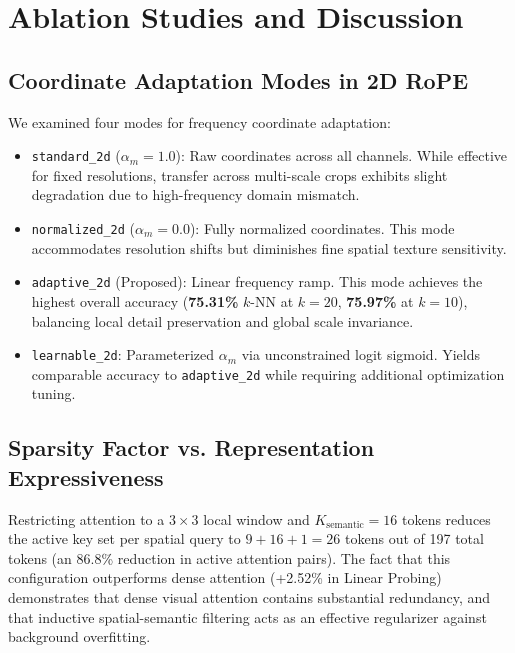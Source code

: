 \documentclass[11pt,a4paper]{article}
\begin{document}
\section{Ablation Studies and Discussion}
\label{sec:ablations}

\subsection{Coordinate Adaptation Modes in 2D RoPE}
We examined four modes for frequency coordinate adaptation:
\begin{itemize}[leftmargin=*]
    \item \texttt{standard\_2d} ($\alpha_m = 1.0$): Raw coordinates across all channels. While effective for fixed resolutions, transfer across multi-scale crops exhibits slight degradation due to high-frequency domain mismatch.
    \item \texttt{normalized\_2d} ($\alpha_m = 0.0$): Fully normalized coordinates. This mode accommodates resolution shifts but diminishes fine spatial texture sensitivity.
    \item \texttt{adaptive\_2d} (Proposed): Linear frequency ramp. This mode achieves the highest overall accuracy (\textbf{75.31\%} $k$-NN at $k=20$, \textbf{75.97\%} at $k=10$), balancing local detail preservation and global scale invariance.
    \item \texttt{learnable\_2d}: Parameterized $\alpha_m$ via unconstrained logit sigmoid. Yields comparable accuracy to \texttt{adaptive\_2d} while requiring additional optimization tuning.
\end{itemize}

\subsection{Sparsity Factor vs. Representation Expressiveness}
Restricting attention to a $3 \times 3$ local window and $K_{\text{semantic}} = 16$ tokens reduces the active key set per spatial query to $9 + 16 + 1 = 26$ tokens out of 197 total tokens (an 86.8\% reduction in active attention pairs). The fact that this configuration outperforms dense attention (+2.52\% in Linear Probing) demonstrates that dense visual attention contains substantial redundancy, and that inductive spatial-semantic filtering acts as an effective regularizer against background overfitting.
\end{document}
